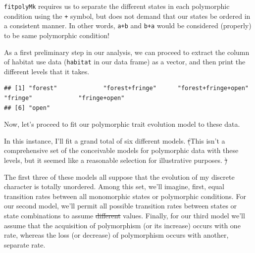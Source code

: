\documentclass[fleqn,10pt,lineno]{wlpeerj}
\newenvironment{Shaded}{\begin{snugshade}}{\end{snugshade}}
\newcommand{\FunctionTok}[1]{\textcolor[rgb]{0.13,0.29,0.53}{\textbf{#1}}}
\newcommand{\NormalTok}[1]{#1}
\newcommand{\OtherTok}[1]{\textcolor[rgb]{0.56,0.35,0.01}{#1}}
\newcommand{\SpecialCharTok}[1]{\textcolor[rgb]{0.81,0.36,0.00}{\textbf{#1}}}
\providecommand{\DIFaddtex}[1]{{\protect\color{blue}\uwave{#1}}} %
\providecommand{\DIFdeltex}[1]{{\protect\color{red}\sout{#1}}}                      %
\providecommand{\DIFaddbegin}{} %
\providecommand{\DIFaddend}{} %
\providecommand{\DIFdelbegin}{} %
\providecommand{\DIFdelend}{} %
\providecommand{\DIFadd}[1]{\texorpdfstring{\DIFaddtex{#1}}{#1}} %
\providecommand{\DIFdel}[1]{\texorpdfstring{\DIFdeltex{#1}}{}} %
\newcommand{\DIFscaledelfig}{0.5}
\newlength{\DIFdelgraphicswidth} %
\newlength{\DIFdelgraphicsheight} %
\newcommand{\DIFaddincludegraphics}[2][]{{\color{blue}\fbox{\DIFOincludegraphics[#1]{#2}}}} %
\newcommand{\DIFdelincludegraphics}[2][]{%
\sbox{\DIFdelgraphicsbox}{\DIFOincludegraphics[#1]{#2}}%
\settoboxwidth{\DIFdelgraphicswidth}{\DIFdelgraphicsbox} %
\settoboxtotalheight{\DIFdelgraphicsheight}{\DIFdelgraphicsbox} %
\scalebox{\DIFscaledelfig}{%
\parbox[b]{\DIFdelgraphicswidth}{\usebox{\DIFdelgraphicsbox}\\[-\baselineskip] \rule{\DIFdelgraphicswidth}{0em}}\llap{\resizebox{\DIFdelgraphicswidth}{\DIFdelgraphicsheight}{%
\setlength{\unitlength}{\DIFdelgraphicswidth}%
\begin{picture}(1,1)%
\thicklines\linethickness{2pt} %
{\color[rgb]{1,0,0}\put(0,0){\framebox(1,1){}}}%
{\color[rgb]{1,0,0}\put(0,0){\line( 1,1){1}}}%
{\color[rgb]{1,0,0}\put(0,1){\line(1,-1){1}}}%
\end{picture}%
}\hspace*{3pt}}} %
} %
\DeclareRobustCommand{\DIFaddbegin}{\DIFOaddbegin \let\includegraphics\DIFaddincludegraphics} %
\DeclareRobustCommand{\DIFaddend}{\DIFOaddend \let\includegraphics\DIFOincludegraphics} %
\DeclareRobustCommand{\DIFdelbegin}{\DIFOdelbegin \let\includegraphics\DIFdelincludegraphics} %
\DeclareRobustCommand{\DIFdelend}{\DIFOaddend \let\includegraphics\DIFOincludegraphics} %
\begin{document}
\texttt{fitpolyMk} requires us to separate the different states in each
polymorphic condition using the \texttt{+} symbol, but does not demand
that our states be ordered in a consistent manner. In other words,
\texttt{a+b} and \texttt{b+a} would be considered (properly) to be same
polymorphic condition! \DIFdelbegin %

\DIFdelend As a first preliminary step in our analysis, we
can proceed to extract the column of habitat use data (\texttt{habitat}
in our data frame) as a vector, and then print the different levels that
it takes.

\begin{Shaded}
\end{Shaded}

\begin{verbatim}
## [1] "forest"             "forest+fringe"      "forest+fringe+open" "fringe"             "fringe+open"       
## [6] "open"
\end{verbatim}

Now, let's proceed to fit our polymorphic trait evolution model to these
data. \DIFdelbegin %

\DIFdelend In this instance, I'll fit a grand total of six different models.
\DIFdelbegin \DIFdel{(}\DIFdelend This isn't a comprehensive set of the conceivable models for polymorphic
data with these levels, but it seemed like a reasonable selection for
illustrative purposes.
\DIFdelbegin \DIFdel{)
}\DIFdelend 

The first three of these models all suppose that the evolution of my
discrete character is totally unordered. Among this set, we'll imagine,
first, equal transition rates between all monomorphic states or
polymorphic conditions. For our second model, we'll permit all possible
transition rates between states or state combinations to assume
\DIFdelbegin \DIFdel{different }\DIFdelend \DIFaddbegin \emph{\DIFadd{different}} \DIFaddend values. Finally, for our third model we'll assume that
the acquisition of polymorphism (or its increase) occurs with one rate,
whereas the loss (or decrease) of polymorphism occurs with another,
separate rate. \DIFdelbegin %
\end{document}
